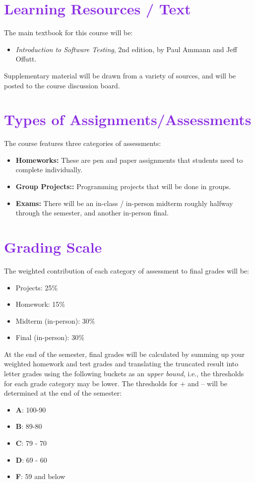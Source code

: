 \documentclass[letterpaper,11pt]{article}
\begin{document}
\section*{\textcolor{BlueViolet}{Learning Resources / Text}}
The main textbook for this course will be:
\begin{itemize}
\item \textit{Introduction to Software Testing}, 2nd edition, by Paul
  Ammann and Jeff Offutt.
\end{itemize}
Supplementary material will be drawn from a variety of sources, and
will be posted to the course discussion board.

\section*{\textcolor{BlueViolet}{Types of Assignments/Assessments}}
The course features three categories of assessments:
\begin{itemize}
  \item \textbf{Homeworks:} These are pen and paper assignments that
    students need to complete individually.
  \item \textbf{Group Projects::} Programming projects that will be
    done in groups.
  \item \textbf{Exams:} There will be an in-class / in-person midterm
    roughly halfway through the semester, and another in-person final.
  \end{itemize}

\section*{\textcolor{BlueViolet}{Grading Scale}}
The weighted contribution of each category of assessment to final
grades will be:
\begin{itemize}
\item Projects: 25\%
\item Homework: 15\%
\item Midterm (in-person): 30\%
\item Final (in-person): 30\%
\end{itemize}

At the end of the semester, final grades will be calculated by summing
up your weighted homework and test grades and translating the
truncated result into letter grades using the following buckets as an
\emph{upper bound}, i.e., the thresholds for each grade category may
be lower. The thresholds for + and – will be determined at the end of
the semester:
\begin{itemize}
\item \textbf{A}: 100-90
\item \textbf{B}: 89-80
\item \textbf{C}: 79 - 70
\item \textbf{D}: 69 - 60
\item \textbf{F}: 59 and below
\end{itemize}
\end{document}
